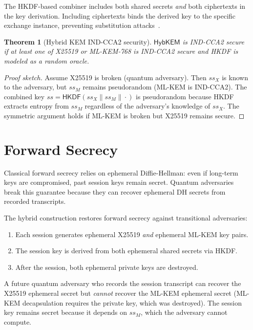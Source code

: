 \documentclass[11pt,a4paper]{article}
\newtheorem{theorem}{Theorem}[section]
\begin{document}
The HKDF-based combiner includes both shared secrets \emph{and} both ciphertexts in
the key derivation. Including ciphertexts binds the derived key to the specific
exchange instance, preventing substitution attacks~\cite{rfc9180}.

\begin{theorem}[Hybrid KEM IND-CCA2 security]
\label{thm:hybrid-kem}
$\textsf{HybKEM}$ is IND-CCA2 secure if at least one of X25519 or ML-KEM-768 is
IND-CCA2 secure and HKDF is modeled as a random oracle.
\end{theorem}

\begin{proof}[Proof sketch]
Assume X25519 is broken (quantum adversary). Then $ss_X$ is known to the adversary,
but $ss_M$ remains pseudorandom (ML-KEM is IND-CCA2). The combined key
$ss = \textsf{HKDF}(ss_X \| ss_M \| \cdot)$ is pseudorandom because HKDF extracts
entropy from $ss_M$ regardless of the adversary's knowledge of $ss_X$. The symmetric
argument holds if ML-KEM is broken but X25519 remains secure.
\end{proof}

\section{Forward Secrecy}
\label{sec:forward-secrecy}

Classical forward secrecy relies on ephemeral Diffie-Hellman: even if long-term keys
are compromised, past session keys remain secret. Quantum adversaries break this
guarantee because they can recover ephemeral DH secrets from recorded transcripts.

The hybrid construction restores forward secrecy against transitional adversaries:

\begin{enumerate}[leftmargin=2em]
  \item Each session generates ephemeral X25519 \emph{and} ephemeral ML-KEM key pairs.
  \item The session key is derived from both ephemeral shared secrets via HKDF.
  \item After the session, both ephemeral private keys are destroyed.
\end{enumerate}

A future quantum adversary who records the session transcript can recover the X25519
ephemeral secret but \emph{cannot} recover the ML-KEM ephemeral secret (ML-KEM
decapsulation requires the private key, which was destroyed). The session key remains
secret because it depends on $ss_M$, which the adversary cannot compute.
\end{document}
